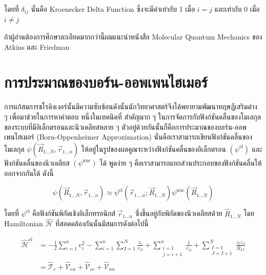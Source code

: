 \noindent โดยที่ $\delta_{i j}$ นั้นคือ Kroenecker Delta Function ซึ่งจะมีค่าเท่ากับ 1 เมื่อ $i=j$ และเท่ากับ 0 เมื่อ $i \neq j$

ถ้าผู้อ่านต้องการศึกษาละเอียดมากกว่านี้ผมแนะนำหนังสือ Molecular Quantum Mechanics ของ Atkins และ Friedman

\section{การประมาณของบอร์น-ออพเพนไฮเมอร์}

การแก้สมการชโรดิงเงอร์นั้นมีความซับซ้อนดังนั้นนักวิทยาศาสตร์จึงได้พยายามพัฒนาทฤษฎีเสริมต่าง ๆ เพื่อมาช่วยในการหาคำตอบ หนึ่งในเทคนิคที่%
สำคัญมาก ๆ ในการจัดการกับฟังก์ชันคลื่นของโมเลกุลของระบบที่มีอิเล็กตรอนและนิวเคลียสหลาย ๆ ตัวอยู่ด้วยกันนั้นก็คือการประมาณของบอร์น-ออพเพนไฮเมอร์
(Born-Oppenheimer Approximation) นั่นคือเราสามารถเขียนฟังก์ชันคลื่นของโมเลกุล $\psi\left(\vec{R}_{1 \ldots N}, \vec{r}_{1
        \ldots n}\right)$ ให้อยู่ในรูปของผลคูณระหว่างฟังก์ชันคลื่นของอิเล็กตรอน $(\psi^{\mathrm{el}})$ และฟังก์ชันคลื่นของนิวเคลียส
$(\psi^{\text{nuc}})$ ได้ พูดง่าย ๆ คือเราสามารถแยกส่วนประกอบของฟังก์ชันคลื่นให้ออกจากกันได้ ดังนี้

\begin{equation}
    \psi\left(\vec{R}_{1 \ldots N}, \vec{r}_{1 \ldots n}\right)
    \approx
    \psi^{\mathrm{el}}\left(\vec{r}_{1 \ldots . n} ; \vec{R}_{1 \ldots N}\right)
    \psi^{\mathrm{nuc}}\left(\vec{R}_{1 \ldots N}\right)
\end{equation}

\noindent โดยที่ $\psi^{\mathrm{el}}$ คือฟังก์ชันพิกัดเชิงอิเล็กทรอนิกส์ $\vec{r}_{1 \ldots n}$ ซึ่งขึ้นอยู่กับพิกัดของนิวเคลียสด้วย
$\hat{R}_{1 \ldots N}$ โดย Hamiltonian $\hat{\mathscr{H}}$ ที่สอดคล้องกันนั้นมีสมการดังต่อไปนี้

\begin{equation}
    \label{eq:hamiltonian_operator_electron}
    \begin{aligned}
        \hat{\mathscr{H}}^{\mathrm{el}}
         & = -\frac{1}{2} \sum_{i=1}^{n} v_{i}^{2}
        - \sum_{i=1}^{n} \sum_{I=1}^{N} \frac{z_{i}}{r_{i I}}
        + \sum_{\substack{i=1                      \\ j=i+1}}^{n} \frac{1}{r_{i j}}
        + \sum_{\substack{I=1                      \\ J=I+1}}^{N} \frac{z_{I} z_{J}}{R_{I J}} \\
         & = \hat{\mathscr{T}}_{e}
        + \hat{\mathscr{V}}_{en}
        + \hat{\mathscr{V}}_{ee}
        + \hat{\mathscr{V}}_{nn}
    \end{aligned}
\end{equation}

